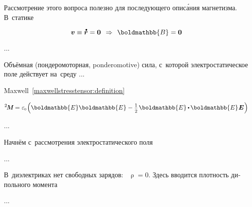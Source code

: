 \begin{otherlanguage}{russian}

Рассмотрение этого вопроса полезно для последующего опис\'{а}ния магнетизма. В~статике

\nopagebreak\vspace{-0.1ex}\begin{equation*}
\bm{v} \equiv \mathdotabove{\bm{r}} = \bm{0}
\hspace{.44em} \Rightarrow \hspace{.4em}
\boldmathbb{B} = \bm{0}
\end{equation*}

...

Объёмная (пондеромоторная, ponderomotive) сила, с~которой электростатическое поле действует на~среду ...

Maxwell~\eqref{maxwellstresstensor:definition} 

\nopagebreak\vspace{-0.1em}\begin{equation*}
\maxwellstress = \vacuumpermittivity \hspace{-0.2ex} \left( \boldmathbb{E} \boldmathbb{E} - \smalldisplaystyleonehalf \hspace{.2ex} \boldmathbb{E} \hspace{-0.1ex} \dotp \hspace{-0.16ex} \boldmathbb{E} \hspace{.1ex} \bm{E} \hspace{.1ex} \right)
\end{equation*}

...


\end{otherlanguage}



\begin{otherlanguage}{russian}

Начнём с~рассмотрения электростатического поля

...

В~диэлектриках нет свободных зарядов: ~${\uprho = 0}$. Здесь вводится плотность дипольного момента

...


\end{otherlanguage}

